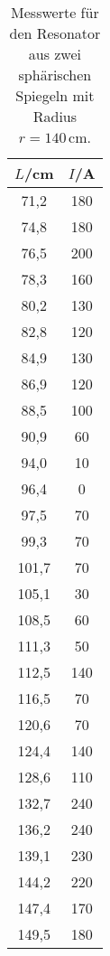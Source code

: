 \begin{table}[htp]
  \caption{Messwerte für den Resonator aus zwei sphärischen Spiegeln mit Radius $r=140$\,cm.}
  \label{tab:konkavkonkav}
	\begin{center}
		\begin{tabular}{cc}
		\toprule
			{$L$/cm} & {$I$/\mu A}\\
			\midrule
			71,2 & 180\\
			74,8 & 180\\
			76,5 & 200\\
			78,3 & 160\\
			80,2 & 130\\
			82,8 & 120\\
			84,9 & 130\\
			86,9 & 120\\
			88,5 & 100\\
			90,9 & 60\\
			94,0 & 10\\
			96,4 & 0\\
			97,5 & 70\\
			99,3 & 70\\
			101,7 & 70\\
			105,1 & 30\\
			108,5 & 60\\
			111,3 & 50\\
			112,5 & 140\\
			116,5 & 70\\
			120,6 & 70\\
			124,4 & 140\\
			128,6 & 110\\
			132,7 & 240\\
			136,2 & 240\\
			139,1 & 230\\
			144,2 & 220\\
			147,4 & 170\\
			149,5 & 180\\
		\bottomrule
		\end{tabular}
	\end{center}
\end{table}

